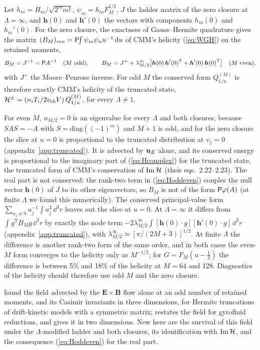 Let $h_m=H_m/\sqrt{2^mm!}$, $\psi_m=h_mF_M^{1/2}$, $J$ the ladder matrix of the zero closure at $\Lambda=\infty$, and $\boldsymbol h(0)$ and $\boldsymbol h'(0)$ the vectors with components $h_m(0)$ and $h_m'(0)$. For the zero closure, the exactness of Gauss--Hermite quadrature gives the matrix $(B_M)_{mn}=\mathrm{P}\!\!\int\psi_m\psi_nu^{-1}\,\mathrm{d} u$ of CMM's helicity (\ref{eq:WGH}) on the retained moments,
\begin{equation}\label{eq:Hoddeven}
  B_M=J^{-1}=\mathsf P A^{-1}\quad(M\ \text{odd}),\qquad
  B_M=J^{+}+\lambda^\infty_{M/2}\big[\boldsymbol h(0)\,\boldsymbol h'(0)^{\mathsf T}+\boldsymbol h'(0)\,\boldsymbol h(0)^{\mathsf T}\big]\quad(M\ \text{even}),
\end{equation}
with $J^+$ the Moore--Penrose inverse. For odd $M$ the conserved form $Q^{(M)}_{1/u}$ is therefore exactly CMM's helicity of the truncated state, $\mathcal H^\pm=(n_iT_i/2v_{\mathrm{th}} V)\,Q^{(M)}_{1/u}$, for every $\Lambda\neq1$.

For even $M$, $u_{M/2}=0$ is an eigenvalue for every $\Lambda$ and both closures, because $SAS=-A$ with $S=\mathrm{diag}((-1)^m)$ and $M+1$ is odd, and for the zero closure the slice at $u=0$ is proportional to the truncated distribution at $v_\parallel=0$ (appendix~\ref{app:truncated}). It is advected by $\boldsymbol u_E$ alone, and its conserved energy is proportional to the imaginary part of (\ref{eq:Hcomplex}) for the truncated state, the truncated form of CMM's conservation of $\mathrm{Im}\,\mathcal H$ (their eqs.~2.22--2.23). The real part is not conserved: the rank-two term in (\ref{eq:Hoddeven}) couples the null vector $\boldsymbol h(0)$ of $J$ to its other eigenvectors, so $B_M$ is not of the form $\mathsf P\varphi(A)$ (at finite $\Lambda$ we found this numerically). The conserved principal-value form $\sum_{u_j\neq0}u_j^{-1}\int a_j^2\,\dd^3r$ leaves out the slice at $u=0$. At $\Lambda=\infty$ it differs from $\int g^{\mathsf T}B_Mg\,\dd^3r$ by exactly the node term $-2\lambda^\infty_{M/2}\int[\boldsymbol h(0)\cdot g][\boldsymbol h'(0)\cdot g]\,\dd^3r$ (appendix~\ref{app:truncated}), with $\lambda^\infty_{M/2}\simeq[\pi/(2M+3)]^{1/2}$. At finite $\Lambda$ the difference is another rank-two form of the same order, and in both cases the even-$M$ form converges to the helicity only as $M^{-1/2}$; for $G=F_M(u-\frac12)$ the difference is between 5\% and 18\% of the helicity at $M=64$ and 128. Diagnostics of the helicity should therefore use odd $M$ and the zero closure.

\citet{Tassi2022} found the field advected by the $\boldsymbol E\times\boldsymbol B$ flow alone at an odd number of retained moments, and its Casimir invariants in three dimensions, for Hermite truncations of drift-kinetic models with a symmetric matrix; \citet[\S3.4]{Tassi2023} restates the field for gyrofluid reductions, and \citet{Tassi2015} gives it in two dimensions. New here are the survival of this field under the $\Lambda$-modified ladder and both closures, its identification with $\mathrm{Im}\,\mathcal H$, and the consequence (\ref{eq:Hoddeven}) for the real part.

